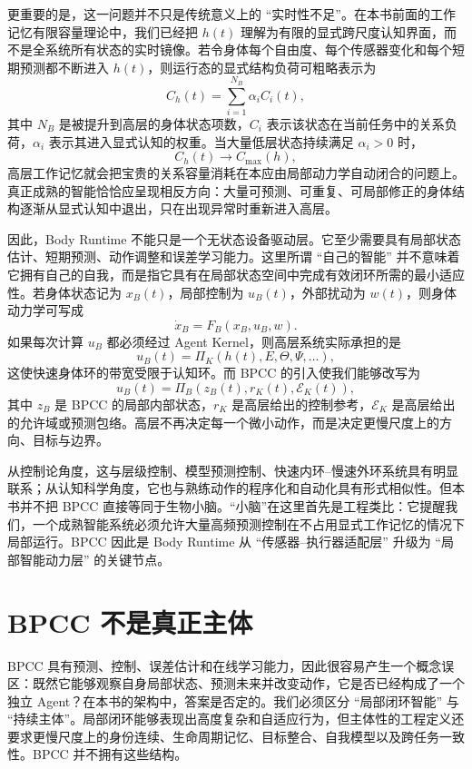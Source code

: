 更重要的是，这一问题并不只是传统意义上的 ``实时性不足''。在本书前面的工作记忆有限容量理论中，我们已经把 $h(t)$ 理解为有限的显式跨尺度认知界面，而不是全系统所有状态的实时镜像。若令身体每个自由度、每个传感器变化和每个短期预测都不断进入 $h(t)$，则运行态的显式结构负荷可粗略表示为
\[
C_h(t)
=
\sum_{i=1}^{N_B}
\alpha_i C_i(t),
\]
其中 $N_B$ 是被提升到高层的身体状态项数，$C_i$ 表示该状态在当前任务中的关系负荷，$\alpha_i$ 表示其进入显式认知的权重。当大量低层状态持续满足 $\alpha_i>0$ 时，
\[
C_h(t) \rightarrow C_{\max}(h),
\]
高层工作记忆就会把宝贵的关系容量消耗在本应由局部动力学自动闭合的问题上。真正成熟的智能恰恰应呈现相反方向：大量可预测、可重复、可局部修正的身体结构逐渐从显式认知中退出，只在出现异常时重新进入高层。

因此，Body Runtime 不能只是一个无状态设备驱动层。它至少需要具有局部状态估计、短期预测、动作调整和误差学习能力。这里所谓 ``自己的智能'' 并不意味着它拥有自己的自我，而是指它具有在局部状态空间中完成有效闭环所需的最小适应性。若身体状态记为 $x_B(t)$，局部控制为 $u_B(t)$，外部扰动为 $w(t)$，则身体动力学可写成
\[
\dot{x}_B
=
F_B(x_B,u_B,w).
\]
如果每次计算 $u_B$ 都必须经过 Agent Kernel，则高层系统实际承担的是
\[
u_B(t)
=
\Pi_K
\left(
h(t),E,\Theta,\Psi,\ldots
\right),
\]
这使快速身体环的带宽受限于认知环。而 BPCC 的引入使我们能够改写为
\[
u_B(t)
=
\Pi_B
\left(
z_B(t),r_K(t),\mathcal E_K(t)
\right),
\]
其中 $z_B$ 是 BPCC 的局部内部状态，$r_K$ 是高层给出的控制参考，$\mathcal E_K$ 是高层给出的允许域或预测包络。高层不再决定每一个微小动作，而是决定更慢尺度上的方向、目标与边界。

从控制论角度，这与层级控制、模型预测控制、快速内环--慢速外环系统具有明显联系；从认知科学角度，它也与熟练动作的程序化和自动化具有形式相似性。但本书并不把 BPCC 直接等同于生物小脑。``小脑''在这里首先是工程类比：它提醒我们，一个成熟智能系统必须允许大量高频预测控制在不占用显式工作记忆的情况下局部运行。BPCC 因此是 Body Runtime 从 ``传感器--执行器适配层'' 升级为 ``局部智能动力层'' 的关键节点。

\section{BPCC 不是真正主体}

BPCC 具有预测、控制、误差估计和在线学习能力，因此很容易产生一个概念误区：既然它能够观察自身局部状态、预测未来并改变动作，它是否已经构成了一个独立 Agent？在本书的架构中，答案是否定的。我们必须区分 ``局部闭环智能'' 与 ``持续主体''。局部闭环能够表现出高度复杂和自适应行为，但主体性的工程定义还要求更慢尺度上的身份连续、生命周期记忆、目标整合、自我模型以及跨任务一致性。BPCC 并不拥有这些结构。


